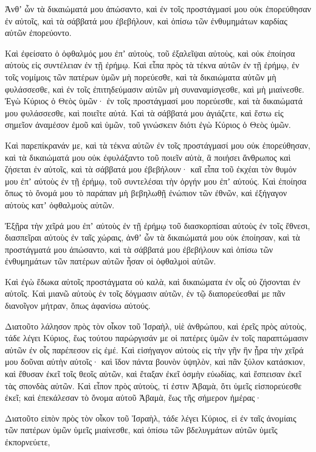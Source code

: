 {Ἀνθʼ ὧν τὰ δικαιώματά μου ἀπώσαντο, καὶ ἐν τοῖς προστάγμασί μου οὐκ ἐπορεύθησαν ἐν αὐτοῖς, καὶ τὰ σάββατά μου ἐβεβήλουν, καὶ ὀπίσω τῶν ἐνθυμημάτων καρδίας αὐτῶν ἐπορεύοντο.
\par }{\PP {}Καὶ ἐφείσατο ὁ ὀφθαλμός μου ἐπʼ αὐτοὺς, τοῦ ἐξαλεῖψαι αὐτοὺς, καὶ οὐκ ἐποίησα αὐτοὺς εἰς συντέλειαν ἐν τῇ ἐρήμῳ.
Καὶ εἶπα πρὸς τὰ τέκνα αὐτῶν ἐν τῇ ἐρήμῳ, ἐν τοῖς νομίμοις τῶν πατέρων ὑμῶν μὴ πορεύεσθε, καὶ τὰ δικαιώματα αὐτῶν μὴ φυλάσσεσθε, καὶ ἐν τοῖς ἐπιτηδεύμασιν αὐτῶν μὴ συναναμίσγεσθε, καὶ μὴ μιαίνεσθε.
Ἐγὼ Κύριος ὁ Θεὸς ὑμῶν· ἐν τοῖς προστάγμασί μου πορεύεσθε, καὶ τὰ δικαιώματά μου φυλάσσεσθε, καὶ ποιεῖτε αὐτά.
Καὶ τὰ σάββατά μου ἁγιάζετε, καὶ ἔστω εἰς σημεῖον ἀναμέσον ἐμοῦ καὶ ὑμῶν, τοῦ γινώσκειν διότι ἐγὼ Κύριος ὁ Θεὸς ὑμῶν.
\par }{\PP {}Καὶ παρεπίκρανάν με, καὶ τὰ τέκνα αὐτῶν ἐν τοῖς προστάγμασί μου οὐκ ἐπορεύθησαν, καὶ τὰ δικαιώματά μου οὐκ ἐφυλάξαντο τοῦ ποιεῖν αὐτὰ, ἃ ποιήσει ἄνθρωπος καὶ ζήσεται ἐν αὐτοῖς, καὶ τὰ σάββατά μου ἐβεβήλουν· καῖ εἶπα τοῦ ἐκχέαι τὸν θυμόν μου ἐπʼ αὐτοὺς ἐν τῇ ἐρήμῳ, τοῦ συντελέσαι τὴν ὀργήν μου ἐπʼ αὐτούς.
Καὶ ἐποίησα ὅπως τὸ ὄνομά μου τὸ παράπαν μὴ βεβηλωθῇ ἐνώπιον τῶν ἐθνῶν, καὶ ἐξήγαγον αὐτοὺς κατʼ ὀφθαλμοὺς αὐτῶν.
\par }{\PP {}Ἐξῇρα τὴν χεῖρά μου ἐπʼ αὐτοὺς ἐν τῇ ἐρήμῳ τοῦ διασκορπίσαι αὐτοὺς ἐν τοῖς ἔθνεσι, διασπεῖραι αὐτοὺς ἐν ταῖς χώραις,
ἀνθʼ ὧν τὰ δικαιώματά μου οὐκ ἐποίησαν, καὶ τὰ προστάγματά μου ἀπώσαντο, καὶ τὰ σάββατά μου ἐβεβήλουν καὶ ὀπίσω τῶν ἐνθυμημάτων τῶν πατέρων αὐτῶν ἦσαν οἱ ὀφθαλμοὶ αὐτῶν.
\par }{\PP {}Καὶ ἐγὼ ἔδωκα αὐτοῖς προστάγματα οὐ καλὰ, καὶ δικαιώματα ἐν οἷς οὐ ζήσονται ἐν αὐτοῖς.
Καὶ μιανῶ αὐτοὺς ἐν τοῖς δόγμασιν αὐτῶν, ἐν τῷ διαπορεύεσθαί με πᾶν διανοῖγον μήτραν, ὅπως ἀφανίσω αὐτούς.
\par }{\PP {}Διατοῦτο λάλησον πρὸς τὸν οἶκον τοῦ Ἰσραὴλ, υἱὲ ἀνθρώπου, καὶ ἐρεῖς πρὸς αὐτοὺς, τάδε λέγει Κύριος, ἕως τούτου παρώργισάν με οἱ πατέρες ὑμῶν ἐν τοῖς παραπτώμασιν αὐτῶν ἐν οἷς παρέπεσον εἰς ἐμέ.
Καὶ εἰσήγαγον αὐτοὺς εἰς τὴν γῆν ἣν ᾖρα τὴν χεῖρά μου δοῦναι αὐτὴν αὐτοῖς· καὶ ἴδον πάντα βουνὸν ὑψηλὸν, καὶ πᾶν ξύλον κατάσκιον, καὶ ἔθυσαν ἐκεῖ τοῖς θεοῖς αὐτῶν, καὶ ἔταξαν ἐκεῖ ὀσμὴν εὐωδίας, καὶ ἔσπεισαν ἐκεῖ τὰς σπονδὰς αὐτῶν.
Καὶ εἶπον πρὸς αὐτοὺς, τί ἐστιν Ἀβαμὰ, ὅτι ὑμεῖς εἰσπορεύεσθε ἐκεῖ; καὶ ἐπεκάλεσαν τὸ ὄνομα αὐτοῦ Ἀβαμὰ, ἕως τῆς σήμερον ἡμέρας·
\par }{\PP {}Διατοῦτο εἰπὸν πρὸς τὸν οἶκον τοῦ Ἰσραὴλ, τάδε λέγει Κύριος, εἰ ἐν ταῖς ἀνομίαις τῶν πατέρων ὑμῶν ὑμεῖς μιαίνεσθε, καὶ ὀπίσω τῶν βδελυγμάτων αὐτῶν ὑμεῖς ἐκπορνεύετε,
}
